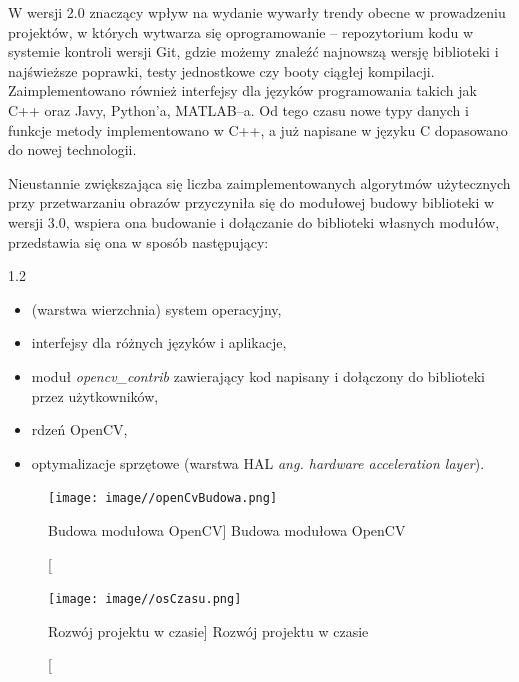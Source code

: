\documentclass[a4paper,12pt]{article}
\newcommand\spacingInSolemnItemize{1.2}
\begin{document}
			 W wersji 2.0 znaczący wpływ na wydanie wywarły trendy obecne w prowadzeniu projektów, w których wytwarza się oprogramowanie -- repozytorium kodu
				w systemie kontroli wersji Git, gdzie możemy znaleźć najnowszą wersję biblioteki i najświeższe poprawki, testy jednostkowe czy booty ciągłej kompilacji. 
				Zaimplementowano również interfejsy dla języków programowania takich jak C++ oraz Javy, Python’a, MATLAB--a. Od tego czasu nowe typy danych 
				i funkcje metody implementowano w C++, a już napisane w języku C dopasowano do nowej technologii. 
			
			Nieustannie zwiększająca się liczba zaimplementowanych algorytmów użytecznych przy przetwarzaniu obrazów przyczyniła się do modułowej budowy 
				biblioteki w wersji 3.0, wspiera ona budowanie i dołączanie do biblioteki własnych modułów, przedstawia się ona w sposób następujący:
                
                \begin{spacing}{\spacingInSolemnItemize}
    				\begin{itemize}
    					\item (warstwa wierzchnia) system operacyjny,
    					\item interfejsy dla różnych języków i aplikacje,
    					
    					
    					\item moduł \textit {opencv\_contrib} zawierający kod napisany i dołączony do biblioteki przez użytkowników,
    					\item rdzeń OpenCV,
    					\item optymalizacje sprzętowe (warstwa HAL \textit {ang. hardware acceleration layer}).
    				\end{itemize} 
                \end{spacing}
            
				\begin{figure}[!ht]  
					\begin{center}
						\texttt{[image: image//openCvBudowa.png]} 
					\end{center}
					\caption
					    [Budowa modułowa OpenCV]
					    {Budowa modułowa OpenCV}
				\end{figure}

				 
	            \newpage
				\begin{figure}[!ht]   
					\begin{center}
		    				\texttt{[image: image//osCzasu.png]} 
					\end{center}
					\caption
					    [Rozwój projektu w czasie]  
					    {Rozwój projektu w czasie}  
				\end{figure}
\end{document}

